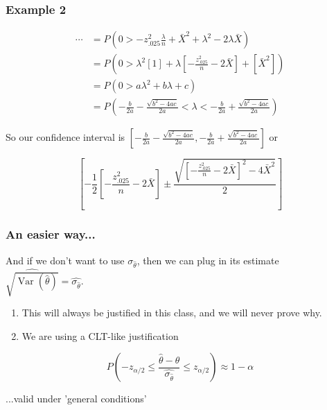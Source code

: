\documentclass{beamer}
\begin{document}

\begin{frame}
\frametitle{Example 2}

\begin{align*}
\cdots &= P\left( 0 > -z_{.025}^2 \frac{\lambda}{n} + \bar{X}^2 + \lambda^2 - 2 \lambda \bar{X} \right) \\
&= P\left( 0 > \lambda^2 \left[1 \right] + \lambda \left[-\frac{z_{.025}^2}{n} - 2 \bar{X}\right] + [\bar{X}^2] \right) \\
&= P\left(0 > a \lambda^2 + b \lambda + c  \right)\\
&= P\left(-\frac{b}{2a} - \frac{\sqrt{b^2-4ac}}{2a}< \lambda < -\frac{b}{2a} + \frac{\sqrt{b^2-4ac}}{2a}  \right)
\end{align*}

So our confidence interval is $\left[-\frac{b}{2a} - \frac{\sqrt{b^2-4ac}}{2a} , -\frac{b}{2a} + \frac{\sqrt{b^2-4ac}}{2a} \right]$ or 

\[
\left[-\frac{1}{2}\left[-\frac{z_{.025}^2}{n} - 2 \bar{X}\right] \pm \frac{\sqrt{\left[-\frac{z_{.025}^2}{n} - 2 \bar{X}\right]^2-4\bar{X}^2}}{2} \right]
\]
\end{frame}

\begin{frame}
\frametitle{An easier way...}


And if we don't want to use $\sigma_{\hat{\theta}}$, then we can plug in its estimate $\widehat{\sqrt{\operatorname{Var}\left(\hat{\theta} \right)} } = \widehat{\sigma_{\hat{\theta}}}$. 

\begin{enumerate}
\item This will always be justified in this class, and we will never prove why.
\item We are using a CLT-like justification
\end{enumerate}

\[
P\left(- z_{\alpha/2} \le \frac{\hat{\theta} - \theta}{\widehat{\sigma_{\hat{\theta}}}} \le z_{\alpha/2}\right) \approx 1 - \alpha
\]

...valid under 'general conditions'


\end{frame}

\end{document}
